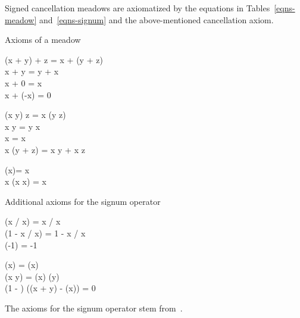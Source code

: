 \documentclass{llncs}
\begin{document}
Signed cancellation meadows are axiomatized by the equations in 
Tables~\ref{eqns-meadow} and~\ref{eqns-signum} and the above-mentioned
cancellation axiom.
\begin{table}[!t]
\caption
{Axioms of a meadow}
\label{eqns-meadow}
\begin{eqntbl}
\begin{eqncol}
(x + y) + z = x + (y + z)                                             \\
x + y = y + x                                                         \\
x + 0 = x                                                             \\
x + (-x) = 0
\end{eqncol}
\qquad\quad
\begin{eqncol}
(x \mul y) \mul z = x \mul (y \mul z)                                 \\
x \mul y = y \mul x                                                   \\
x  = x                                                          \\
x \mul (y + z) = x \mul y + x \mul z
\end{eqncol}
\qquad\quad
\begin{eqncol}
(x\minv)\minv = x                                                     \\
x \mul (x \mul x\minv) = x                           
\end{eqncol}
\end{eqntbl}
\end{table}
\begin{table}[!t]
\caption{Additional axioms for the signum operator}
\label{eqns-signum}
\begin{eqntbl}
\begin{eqncol}
\sign(x / x) = x / x                                                  \\
\sign(1 - x / x) = 1 - x / x                                          \\
\sign(-1) = -1
\end{eqncol}
\qquad\quad
\begin{eqncol}
\sign(x\minv) = \sign(x)                                              \\
\sign(x \mul y) = \sign(x) \mul \sign(y)                              \\
(1 - ) \mul
(\sign(x + y) - \sign(x)) = 0
\end{eqncol}
\end{eqntbl}
\end{table}
The axioms for the signum operator stem from~\cite{BBP13a}.
\end{document}
